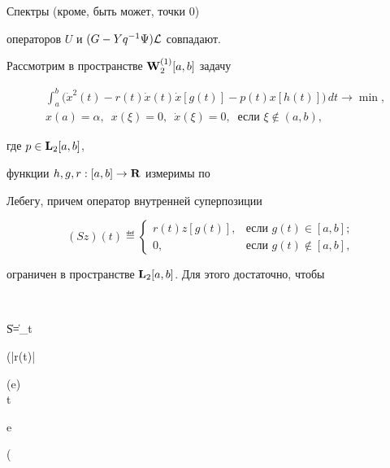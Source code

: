 \begin{note} Спектры (кроме, быть может, точки 0)


операторов $U$ и $(G-Yq^{-1}\Psi){\cal L}$ совпадают.


\end{note}





\begin{exam} Рассмотрим в пространстве $\bold W{}_2^{(1)}[a,b]$ задачу


\begin{equation}


\begin{split}


&\int_a^b\big


(\Dot x^2(t)-r(t)\Dot


x(t)\Dot x[g(t)]-p(t)x[h(t)]\big)\,dt\longrightarrow\min,\\


&x(a)=\alpha,\ \;


x(\xi)=0,\ \; \Dot x(\xi)=0,\ \text{ если }\xi\notin(a,b),


\end{split}


\end{equation}


где $p\in\bold L{}_2[a,b]$,


функции $h,g,r:[a,b]\to\bold R{}$ измеримы по


Лебегу, причем оператор внутренней суперпозиции


$$


(Sz)(t)\eqdef


\begin{cases}


r(t)z[g(t)],&\text{если }g(t)\in[a,b];\\


0, & \text{если }g(t)\notin[a,b],


\end{cases}


$$


ограничен в пространстве $\bold L{}_2[a,b]$. Для этого достаточно, чтобы


\cite{D1}


$$


\|S\|=\vraisup_{t\in[a,b]}


\bigg(|r(t)|\lim\begin{Sb} \mes (e)\\ t\in


e\subset[a,b] \end{Sb} \Big(



\end{exam}
